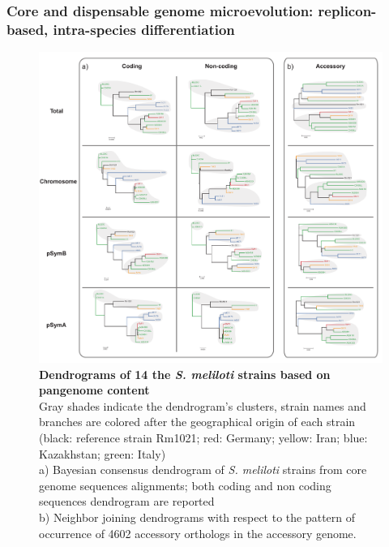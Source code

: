 \subsubsection{Core and dispensable genome microevolution: replicon-based, intra-species differentiation}
\begin{figure}[!tb]
	\center
    \includegraphics[width=1\textwidth]{figures/4/thesis_28}
	\caption{\label{fig:dendrogram}\textbf{Dendrograms of 14 the \textit{S. meliloti} strains based on pangenome content}\\Gray shades indicate the dendrogram’s clusters, strain names and branches are colored after the geographical origin of each strain (black: reference strain Rm1021; red: Germany; yellow: Iran; blue: Kazakhstan; green: Italy)\\
	a) Bayesian consensus dendrogram of \textit{S. meliloti} strains from core genome sequences alignments; both coding and non coding sequences dendrogram are reported\\
	b) Neighbor joining dendrograms with respect to the pattern of occurrence of 4602 accessory orthologs in the accessory genome.}
\end{figure}

